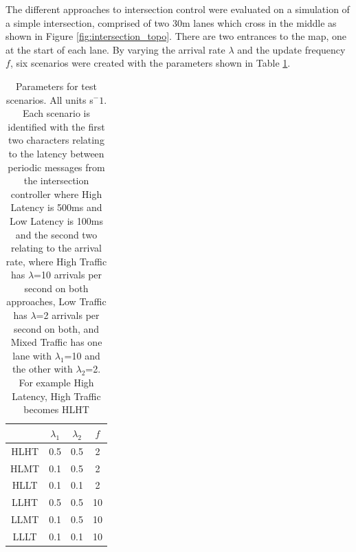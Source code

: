 \documentclass[]{article}
\begin{document}
The different approaches to intersection control were evaluated on a simulation of a simple intersection, comprised of two 30m lanes which cross in the middle as shown in Figure \ref{fig:intersection_topo}. There are two entrances to the map, one at the start of each lane. By varying the arrival rate $\lambda$ and the update frequency $f$, six scenarios were created with the parameters shown in Table \ref{tab:params}.
\begin{table}
	\begin{tabular}{|c|c|c|c|}
		\hline
		& $\lambda_1$ & $\lambda_2$ & $f$ \\
		\hline
		HLHT & 0.5 & 0.5 & 2 \\
		HLMT & 0.1 & 0.5 & 2 \\
		HLLT & 0.1 & 0.1 & 2 \\
		LLHT & 0.5 & 0.5 & 10 \\
		LLMT & 0.1 & 0.5 & 10 \\
		LLLT & 0.1 & 0.1 & 10 \\
		\hline
	\end{tabular}
	\label{tab:params}
	\caption{Parameters for test scenarios. All units s$^-1$. Each scenario is identified with the first two characters relating to the latency between periodic messages from the intersection controller where High Latency is 500ms and  Low Latency is 100ms and the second two relating to the arrival rate, where High Traffic has $\lambda$=10 arrivals per second on both approaches, Low Traffic has $\lambda$=2 arrivals per second on both, and Mixed Traffic has one lane with $\lambda_1$=10 and the other with $\lambda_2$=2. For example High Latency, High Traffic becomes HLHT}
\end{table}
\end{document}
